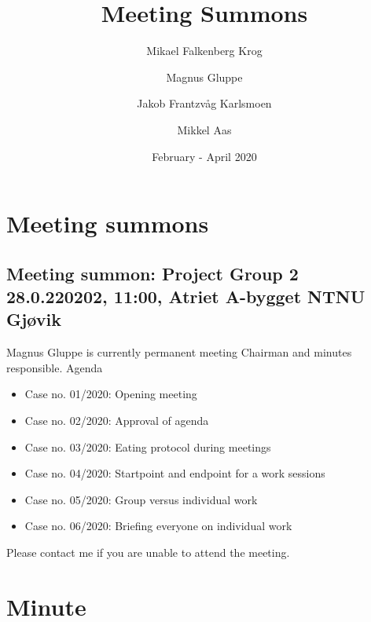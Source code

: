 \documentclass{article}
\title{Meeting Summons}
\author{Mikael Falkenberg Krog \and Magnus Gluppe \and Jakob Frantzvåg Karlsmoen \and Mikkel Aas}
\date{February - April 2020}
\begin{document}
\maketitle
\tableofcontents
\newpage
\section{Meeting summons}
\subsection[Meeting summon: Project Group 2]{Meeting summon: Project Group 2\\ {\large 28.0.220202, 11:00, Atriet A-bygget NTNU Gjøvik}}

Magnus Gluppe is currently permanent meeting Chairman and minutes responsible.
\newline
\newline
\large Agenda 
\begin{itemize}
    \item Case no. 01/2020:  Opening meeting
    \item Case no. 02/2020:  Approval of agenda
    \item Case no. 03/2020:  Eating protocol during meetings
    \item Case no. 04/2020:  Startpoint and endpoint for a work sessions
    \item Case no. 05/2020:  Group versus individual work
    \item Case no. 06/2020:  Briefing everyone on individual work
\end{itemize}
\newline
\newline
Please contact me if you are unable to attend the meeting.

\newpage
\section{Minute}
\end{document}
